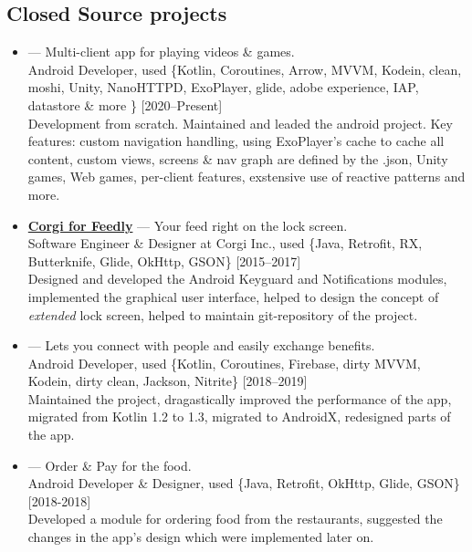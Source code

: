 \documentclass[a4paper]{article}
\begin{document}
	\subsection*{Closed Source projects}
	\begin{itemize}
		\item \faAndroid {} --- Multi-client app for playing videos \& games. \\[0.2em]
		{\footnotesize Android Developer, used \{Kotlin, Coroutines, Arrow, MVVM, Kodein, clean, moshi, Unity, NanoHTTPD, ExoPlayer, glide, adobe experience, IAP, datastore \& more \} \hfill [2020--Present]} \\[0.2em]
		Development from scratch. Maintained and leaded the android project. Key features: custom navigation handling, using ExoPlayer's cache to cache all content, custom views, screens \& nav graph are defined by the .json, Unity games, Web games, per-client features, exstensive use of reactive patterns and more. 
		
		\item \faAndroid \enskip \href{http://getcorgi.com/}{\textbf{Corgi for Feedly}} --- Your feed right on the lock screen. \\[0.2em]
		{\footnotesize Software Engineer \& Designer at Corgi Inc., used \{Java, Retrofit, RX, Butterknife, Glide, OkHttp, GSON\} \hfill [2015--2017]} \\[0.2em]
		Designed and developed the Android Keyguard and Notifications modules, implemented the graphical user interface, helped to design the concept of \textit{extended} lock screen, helped to maintain git-repository of the project.
		
		\item \faAndroid {} --- Lets you connect with people and easily exchange benefits. \\[0.2em]
		{\footnotesize Android Developer, used \{Kotlin, Coroutines, Firebase, dirty MVVM, Kodein, dirty clean, Jackson, Nitrite\} \hfill [2018--2019]} \\[0.2em]
		Maintained the project, dragastically improved the performance of the app, migrated from Kotlin 1.2 to 1.3, migrated to AndroidX, redesigned parts of the app.
		
		\item \faAndroid {} --- Order \& Pay for the food. \\[0.2em]
		{\footnotesize Android Developer \& Designer, used \{Java, Retrofit, OkHttp, Glide, GSON\} \hfill [2018-2018]} \\[0.2em]
		Developed a module for ordering food from the restaurants, suggested the changes in the app's design which were implemented later on. 
		

\end{itemize}
\end{document}
